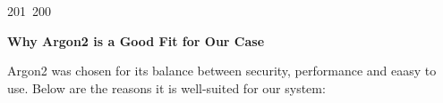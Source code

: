 201~200~\documentclass{article}
\begin{document}
	                                                                                                                                                                                                                                                                                                	                                                                                                                                        	    	                                                                                                	                                                                                                                                                                                                                                                                                                                                	                                                                        	                                                                        	                                                                    \textbf{Why Argon2 is a Good Fit for Our Case}

	                                                                                                                                                                                                                                                                                                	                                                                                                                                        	    	                                                                                                	                                                                                                                                                                                                                                                                                                                                	                                                                        	                                                                        	                                                                    Argon2 was chosen for its balance between security, performance and eaasy to use. Below are the reasons it is well-suited for our system:
\end{document}
